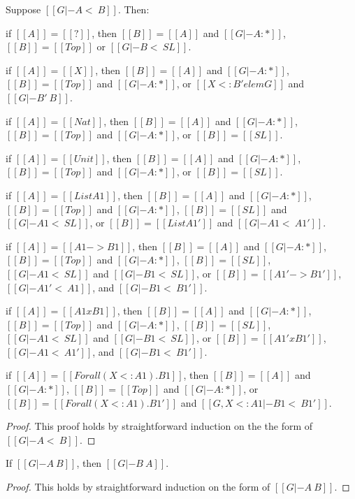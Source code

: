 \begin{lemma}
  \label{lemma:inversion_of_consistent_subtyping}
  Suppose $[[G |- A <~ B]]$. Then:
  \begin{enumR}
  \item if $[[A]] = [[?]]$, then
    $[[B]] = [[A]]$ and $[[G |- A : *]]$, $[[B]] = [[Top]]$ or $[[G |- B <~ SL]]$.
  \item if $[[A]] = [[X]]$, then
    $[[B]] = [[A]]$ and $[[G |- A : *]]$, $[[B]] = [[Top]]$ and $[[G |- A : *]]$, or $[[X <: B' elem G]]$ and $[[G |- B' ~ B]]$.
  \item if $[[A]] = [[Nat]]$, then
    $[[B]] = [[A]]$ and $[[G |- A : *]]$, $[[B]] = [[Top]]$ and $[[G |- A : *]]$, or $[[B]] = [[SL]]$.
  \item if $[[A]] = [[Unit]]$, then
    $[[B]] = [[A]]$ and $[[G |- A : *]]$, $[[B]] = [[Top]]$ and $[[G |- A : *]]$, or $[[B]] = [[SL]]$.
  \item if $[[A]] = [[List A1]]$, then
    $[[B]] = [[A]]$ and $[[G |- A : *]]$, $[[B]] = [[Top]]$ and $[[G |- A : *]]$, $[[B]] = [[SL]]$ and $[[G |- A1 <~ SL]]$,
    or $[[B]] = [[List A1']]$ and $[[G |- A1 <~ A1']]$.
  \item if $[[A]] = [[A1 -> B1]]$, then
    $[[B]] = [[A]]$ and $[[G |- A : *]]$, $[[B]] = [[Top]]$ and $[[G |- A : *]]$, $[[B]] = [[SL]]$, $[[G |- A1 <~ SL]]$ and
    $[[G |- B1 <~ SL]]$, or $[[B]] = [[A1' -> B1']]$, $[[G |- A1' <~ A1]]$, and $[[G |- B1 <~ B1']]$.
  \item if $[[A]] = [[A1 x B1]]$, then
    $[[B]] = [[A]]$ and $[[G |- A : *]]$, $[[B]] = [[Top]]$ and $[[G |- A : *]]$, $[[B]] = [[SL]]$, $[[G |- A1 <~ SL]]$ and
    $[[G |- B1 <~ SL]]$, or $[[B]] = [[A1' x B1']]$, $[[G |- A1 <~ A1']]$, and $[[G |- B1 <~ B1']]$.
  \item if $[[A]] = [[Forall (X <: A1).B1]]$, then
    $[[B]] = [[A]]$ and $[[G |- A : *]]$, $[[B]] = [[Top]]$ and $[[G |- A : *]]$,
    or $[[B]] = [[Forall (X <: A1).B1']]$ and $[[G, X <: A1 |- B1 <~ B1']]$.
  \end{enumR}
\end{lemma}
\begin{proof}
  This proof holds by straightforward induction on the the form of $[[G |- A <~ B]]$.
\end{proof}

\begin{lemma}
  \label{lemma:symmetry_for_type_consistency}
  If $[[G |- A ~ B]]$, then $[[G |- B ~ A]]$.
\end{lemma}
\begin{proof}
  This holds by straightforward induction on the form of $[[G |- A ~ B]]$.
\end{proof}

